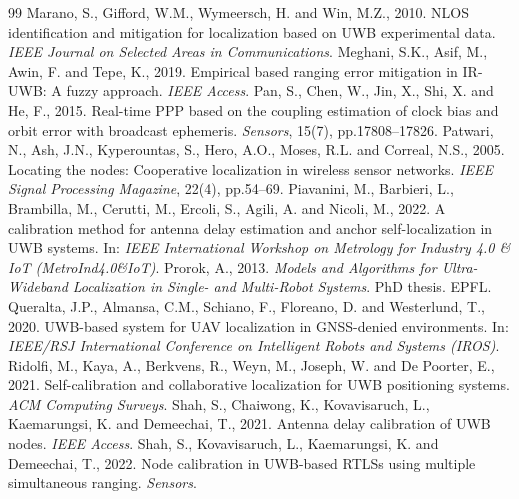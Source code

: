\documentclass[10pt,a4paper]{article}
\begin{document}
\begin{thebibliography}{99}
 Marano, S., Gifford, W.M., Wymeersch, H. and Win, M.Z., 2010. NLOS identification and mitigation for localization based on UWB experimental data. \emph{IEEE Journal on Selected Areas in Communications}.
 Meghani, S.K., Asif, M., Awin, F. and Tepe, K., 2019. Empirical based ranging error mitigation in IR-UWB: A fuzzy approach. \emph{IEEE Access}.
 Pan, S., Chen, W., Jin, X., Shi, X. and He, F., 2015. Real-time PPP based on the coupling estimation of clock bias and orbit error with broadcast ephemeris. \emph{Sensors}, 15(7), pp.17808--17826.
 Patwari, N., Ash, J.N., Kyperountas, S., Hero, A.O., Moses, R.L. and Correal, N.S., 2005. Locating the nodes: Cooperative localization in wireless sensor networks. \emph{IEEE Signal Processing Magazine}, 22(4), pp.54--69.
 Piavanini, M., Barbieri, L., Brambilla, M., Cerutti, M., Ercoli, S., Agili, A. and Nicoli, M., 2022. A calibration method for antenna delay estimation and anchor self-localization in UWB systems. In: \emph{IEEE International Workshop on Metrology for Industry 4.0 \& IoT (MetroInd4.0\&IoT)}.
 Prorok, A., 2013. \emph{Models and Algorithms for Ultra-Wideband Localization in Single- and Multi-Robot Systems}. PhD thesis. EPFL.
 Queralta, J.P., Almansa, C.M., Schiano, F., Floreano, D. and Westerlund, T., 2020. UWB-based system for UAV localization in GNSS-denied environments. In: \emph{IEEE/RSJ International Conference on Intelligent Robots and Systems (IROS)}.
 Ridolfi, M., Kaya, A., Berkvens, R., Weyn, M., Joseph, W. and De Poorter, E., 2021. Self-calibration and collaborative localization for UWB positioning systems. \emph{ACM Computing Surveys}.
 Shah, S., Chaiwong, K., Kovavisaruch, L., Kaemarungsi, K. and Demeechai, T., 2021. Antenna delay calibration of UWB nodes. \emph{IEEE Access}.
 Shah, S., Kovavisaruch, L., Kaemarungsi, K. and Demeechai, T., 2022. Node calibration in UWB-based RTLSs using multiple simultaneous ranging. \emph{Sensors}.

\end{thebibliography}
\end{document}
